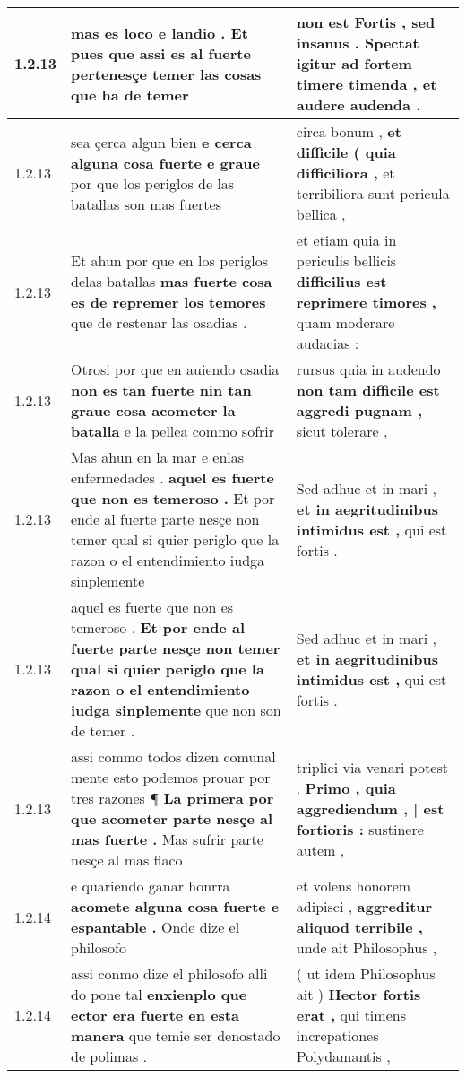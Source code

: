 \begin{tabular}{|p{1cm}|p{6.5cm}|p{6.5cm}|}
1.2.13 & mas es loco e landio . \textbf{ Et pues que assi es al fuerte pertenesçe temer las cosas } que ha de temer & non est Fortis , sed insanus . \textbf{ Spectat igitur ad fortem timere timenda , } et audere audenda . \\\hline
1.2.13 & sea çerca algun bien \textbf{ e cerca alguna cosa fuerte e graue } por que los periglos de las batallas son mas fuertes & circa bonum , \textbf{ et difficile ( quia difficiliora , } et terribiliora sunt pericula bellica , \\\hline
1.2.13 & Et ahun por que en los periglos delas batallas \textbf{ mas fuerte cosa es de repremer los temores } que de restenar las osadias . & et etiam quia in periculis bellicis \textbf{ difficilius est reprimere timores , } quam moderare audacias : \\\hline
1.2.13 & Otrosi por que en auiendo osadia \textbf{ non es tan fuerte nin tan graue cosa acometer la batalla } e la pellea commo sofrir & rursus quia in audendo \textbf{ non tam difficile est aggredi pugnam , } sicut tolerare , \\\hline
1.2.13 & Mas ahun en la mar e enlas enfermedades . \textbf{ aquel es fuerte que non es temeroso . } Et por ende al fuerte parte nesçe non temer qual si quier periglo que la razon o el entendimiento iudga sinplemente & Sed adhuc et in mari , \textbf{ et in aegritudinibus intimidus est , } qui est fortis . \\\hline
1.2.13 & aquel es fuerte que non es temeroso . \textbf{ Et por ende al fuerte parte nesçe non temer qual si quier periglo que la razon o el entendimiento iudga sinplemente } que non son de temer . & Sed adhuc et in mari , \textbf{ et in aegritudinibus intimidus est , } qui est fortis . \\\hline
1.2.13 & assi commo todos dizen comunal mente esto podemos prouar por tres razones ¶ \textbf{ La primera por que acometer parte nesçe al mas fuerte . } Mas sufrir parte nesçe al mas fiaco & triplici via venari potest . \textbf{ Primo , quia aggrediendum , | est fortioris : } sustinere autem , \\\hline
1.2.14 & e quariendo ganar honrra \textbf{ acomete alguna cosa fuerte e espantable . } Onde dize el philosofo & et volens honorem adipisci , \textbf{ aggreditur aliquod terribile , } unde ait Philosophus , \\\hline
1.2.14 & assi conmo dize el philosofo alli do pone tal \textbf{ enxienplo que ector era fuerte en esta manera } que temie ser denostado de polimas . & ( ut idem Philosophus ait ) \textbf{ Hector fortis erat , } qui timens increpationes Polydamantis , \\\hline

\end{tabular}
